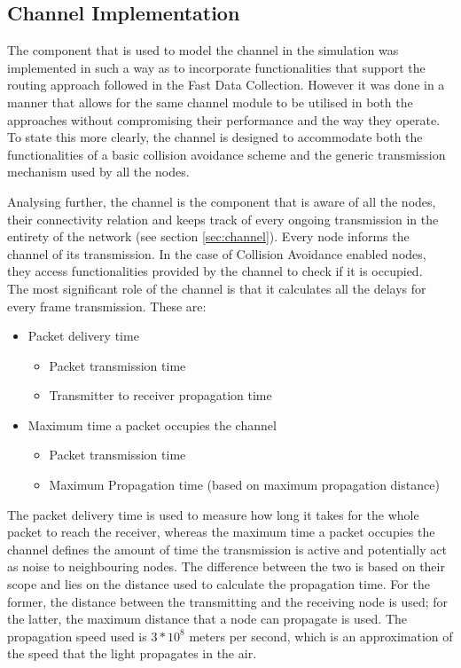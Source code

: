 
\subsection{Channel Implementation}
The component that is used to model the channel in the simulation was implemented in such a way as to incorporate functionalities that support the routing approach followed in the Fast Data Collection. However it was done in a manner that allows for the same channel module to be utilised in both the approaches without compromising their performance and the way they operate. To state this more clearly, the channel is designed to accommodate both the functionalities of a basic collision avoidance scheme and the generic transmission mechanism used by all the nodes.

Analysing further, the channel is the component that is aware of all the nodes, their connectivity relation and keeps track of every ongoing transmission in the entirety of the network (see section \ref{sec:channel}). Every node informs the channel of its transmission. In the case of Collision Avoidance enabled nodes, they access functionalities provided by the channel to check if it is occupied.\\
The most significant role of the channel is that it calculates all the delays for every frame transmission. These are:

\begin{itemize}
\item Packet delivery time
	\begin{itemize}
	\item Packet transmission time
	\item Transmitter to receiver propagation time
	\end{itemize}
\item Maximum time a packet occupies the channel
	\begin{itemize}
	\item Packet transmission time
	\item Maximum Propagation time (based on maximum propagation distance)
	\end{itemize}
\end{itemize}

The packet delivery time is used to measure how long it takes for the whole packet to reach the receiver, whereas the maximum time a packet occupies the channel defines the amount of time the transmission is active and potentially act as noise to neighbouring nodes. The difference between the two is based on their scope and lies on the distance used to calculate the propagation time. For the former, the distance between the transmitting and the receiving node is used; for the latter, the maximum distance that a node can propagate is used. The propagation speed used is $3*10^8$ meters per second, which is an approximation of the speed that the light propagates in the air.

